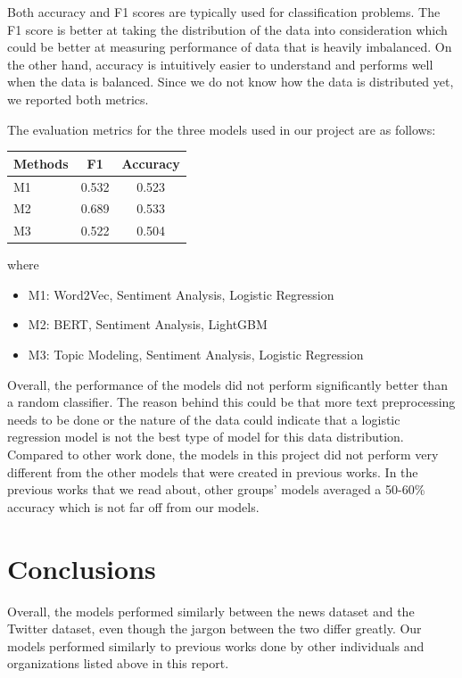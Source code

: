 \documentclass[conference]{IEEEtran}
\begin{document}
Both accuracy and F1 scores are typically used for classification problems. The F1 score is better at taking the distribution of the data into consideration which could be better at measuring performance of data that is heavily imbalanced. On the other hand, accuracy is intuitively easier to understand and performs well when the data is balanced. Since we do not know how the data is distributed yet, we reported both metrics.

The evaluation metrics for the three models used in our project are as follows:




\begin{table}[htp]
    \begin{center}
        \begin{tabular}{|l||c|c|} \hline\hline
            Methods                                               & F1         & Accuracy  \\ \hline
            M1                    & 0.532        & 0.523   \\
            M2 & 0.689       & 0.533   \\
            M3                  & 0.522 & 0.504   \\
            \hline\hline
        \end{tabular}
    \end{center}
\end{table}
where

\begin{itemize}
 \item M1: Word2Vec, Sentiment Analysis, Logistic Regression
 \item M2: BERT, Sentiment Analysis, LightGBM
 \item M3: Topic Modeling, Sentiment Analysis, Logistic Regression
\end{itemize}

Overall, the performance of the models did not perform significantly better than a random classifier. The reason behind this could be that more text preprocessing needs to be done or the nature of the data could indicate that a logistic regression model is not the best type of model for this data distribution. Compared to other work done, the models in this project did not perform very different from the other models that were created in previous works. In the previous works that we read about, other groups' models averaged a 50-60\% accuracy which is not far off from our models. 

\section{Conclusions}
Overall, the models performed similarly between the news dataset and the Twitter dataset, even though the jargon between the two differ greatly. Our models performed similarly to previous works done by other individuals and organizations listed above in this report. 
\end{document}
